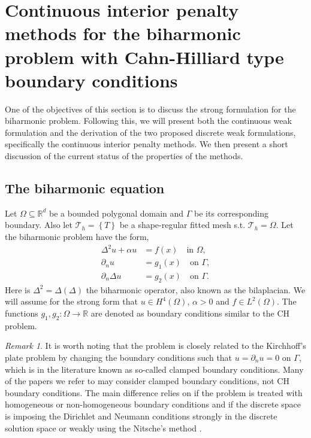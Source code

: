 \documentclass[11pt]{article}
\theoremstyle{remark}
\newtheorem*{remark}{Remark}
\numberwithin{equation}{section}
\begin{document}
\section{Continuous interior penalty methods for the biharmonic problem with Cahn-Hilliard type boundary conditions}%
\label{sec:CIP_biharmonic_problem}

One of the objectives of this section is to discuss the strong formulation for the biharmonic problem.
Following this, we will present both the continuous weak formulation and the derivation of the two proposed discrete weak formulations, specifically the continuous interior penalty methods.
We then present a short discussion of the current status of the properties of the methods.

\subsection{The biharmonic equation}
\label{sub:the_biharmonic_problem_with_c_h_boundary_conditions}

Let $\Omega \subseteq    \mathbb{R} ^d$ be a bounded polygonal domain and $\Gamma $ be its corresponding boundary. Also let $\mathcal{T}_{h} = \left\{ T \right\} $ be a shape-regular fitted mesh s.t. $\mathcal{T}_{h} = \Omega $. Let the biharmonic problem have the form,
\begin{subequations}
\begin{align}
    \Delta^2  u  + \alpha  u  & = f( x)  \quad \text{in } \Omega,   \label{eq:bi_problem_a}\\
    \partial _{n} u & = g_{1}(x)   \quad \text{on } \Gamma ,  \label{eq:bi_problem_b}\\
    \partial _{n} \Delta  u & = g_{2}( x)   \quad \text{on } \Gamma .  \label{eq:bi_problem_c}
\end{align}
\label{eq:bi_problem}
\end{subequations}
Here is $\Delta ^2 = \Delta  \left( \Delta  \right) $ the biharmonic operator, also known as the bilaplacian. We will assume for the strong form that $u \in H^{4}\left( \Omega  \right) $, $\alpha  >0 $ and $f \in L^{2}\left( \Omega  \right)
$. The functions $g_{1},g_{2}: \Omega  \to \mathbb{R}$ are denoted as boundary conditions similar to the CH problem.

\begin{remark}
It is worth noting that the problem is closely related to the Kirchhoff's plate problem by changing the boundary conditions such that $u = \partial _{n } u = 0$ on $\Gamma $, which is in the literature known as so-called clamped boundary conditions.
Many of the papers we refer to may consider clamped boundary conditions, not CH boundary conditions.
The main difference relies on if the problem is treated with homogeneous or non-homogeneous boundary conditions and if the discrete space is
imposing the Dirichlet and Neumann conditions strongly in the discrete solution space or weakly using the Nitsche's method \cite{nitsche1971variationsprinzip}.
\end{remark}
\end{document}
